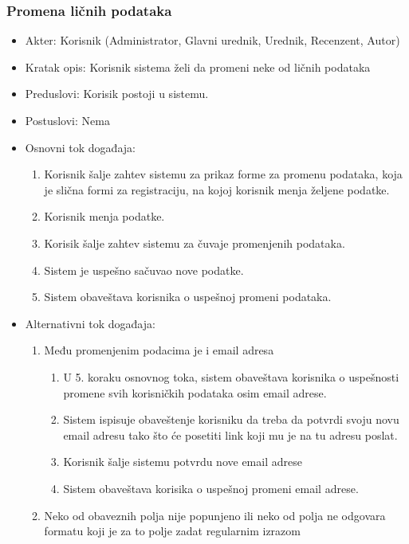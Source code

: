 \documentclass[a4paper]{article}
\begin{document}
\subsubsection{Promena ličnih podataka}
\label{subsubsection:promenalicnihpodataka}
\begin{itemize}
    \item Akter: Korisnik (Administrator, Glavni urednik, Urednik, Recenzent, Autor)
    \item Kratak opis: Korisnik sistema želi da promeni neke od ličnih podataka
    \item Preduslovi: Korisik postoji u sistemu.
    \item Postuslovi: Nema
    \item Osnovni tok događaja:
        \begin{enumerate}
            \item Korisnik šalje zahtev sistemu za prikaz forme za promenu podataka, koja je slična formi za registraciju, na kojoj korisnik menja željene podatke.
            \item Korisnik menja podatke.
            \item Korisik šalje zahtev sistemu za čuvaje promenjenih podataka.
            \item Sistem je uspešno sačuvao nove podatke.
            \item Sistem obaveštava korisnika o uspešnoj promeni podataka.
        \end{enumerate}
    \item Alternativni tok događaja:
        \begin{enumerate}
            \item Među promenjenim podacima je i email adresa
                \begin{enumerate}
                    \item U 5. koraku osnovnog toka, sistem obaveštava korisnika o uspešnosti promene svih korisničkih podataka osim email adrese.
                    \item Sistem ispisuje obaveštenje korisniku da treba da potvrdi svoju novu email adresu tako što će posetiti link koji mu je na tu adresu poslat.
                    \item Korisnik šalje sistemu potvrdu nove email adrese
                    \item Sistem obaveštava korisika o uspešnoj promeni email adrese.
                \end{enumerate}
            \item Neko od obaveznih polja nije popunjeno ili neko od polja ne odgovara formatu koji je za to polje zadat regularnim izrazom

\end{enumerate}
\end{itemize}
\end{document}
